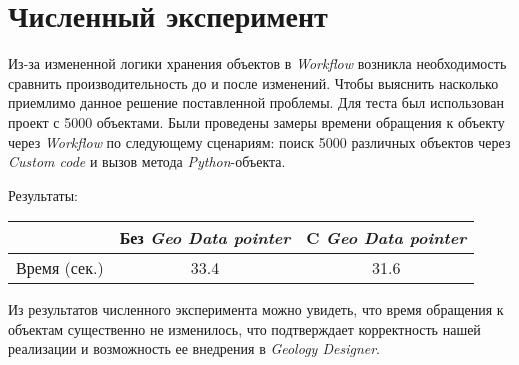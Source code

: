 \section{Численный эксперимент}
Из-за измененной логики хранения объектов в \emph{Workflow} возникла необходимость сравнить производительность до и после изменений. Чтобы выяснить насколько приемлимо данное решение поставленной проблемы. 
Для теста был использован проект с 5000 объектами. Были проведены замеры времени обращения к объекту через \emph{Workflow} по следующему сценариям: поиск 5000 различных объектов через \emph{Custom code} и вызов метода \emph{Python}-объекта.

Результаты:
\begin{center}
	\begin{tabular}{|c|c|c|}
		\hline
		& Без \emph{Geo Data pointer} &  C \emph{Geo Data pointer}\\
		\hline
		Время (сек.) & 33.4 & 31.6 \\
		\hline
	\end{tabular}
\end{center}

Из результатов численного эксперимента можно увидеть, что время обращения к объектам существенно не изменилось, что подтверждает корректность нашей реализации и возможность ее внедрения в \emph{Geology Designer}.